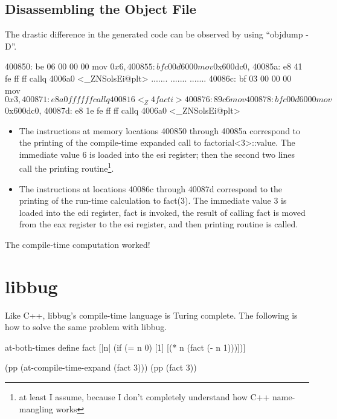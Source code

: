  \subsection{Disassembling the Object File}
 The drastic difference in the generated code can be observed by using ``objdump -D''.

 \begin{code}
 400850: be 06 00 00 00   mov    $0x6,%
 400855: bf c0 0d 60 00   mov    $0x600dc0,%
 40085a: e8 41 fe ff ff   callq  4006a0 <_ZNSolsEi@plt>
 .......
 .......
 .......
 40086c: bf 03 00 00 00   mov    $0x3,%
 400871: e8 a0 ff ff ff   callq  400816 <_Z4facti>
 400876: 89 c6            mov    %
 400878: bf c0 0d 60 00   mov    $0x600dc0,%
 40087d: e8 1e fe ff ff   callq  4006a0 <_ZNSolsEi@plt>
 \end{code}

 \begin{itemize}
   \item
 The instructions at memory locations 400850 through 40085a correspond to the
 printing of the compile-time expanded call to factorial\textless3\textgreater::value.
 The immediate value 6 is loaded into the esi register; then the second
 two lines call the printing routine\footnote{at least I assume, because
 I don't completely understand how C++ name-mangling works}.
   \item
 The instructions at locations 40086c through 40087d correspond to the
 printing of the run-time calculation to fact(3).  The immediate value 3
 is loaded into the edi register, fact is invoked, the result of
 calling fact is moved from the eax register to the esi register, and then
 printing routine is called.

 \end{itemize}
 The compile-time computation worked!

 \section{libbug}
 Like C++, libbug's compile-time language is Turing complete.
 The following is how to solve the same problem with libbug.

 \begin{code}
 {at-both-times
  {define fact
    [|n| (if (= n 0)
             [1]
             [(* n (fact (- n 1)))])]}}

 (pp (at-compile-time-expand (fact 3)))
 (pp (fact 3))
 \end{code}

